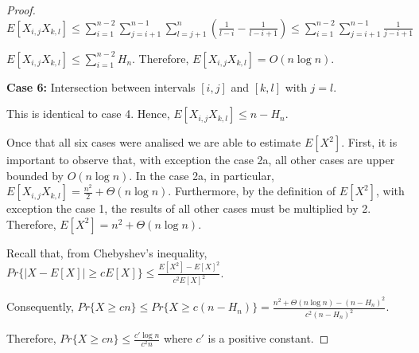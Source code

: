 \documentclass[12pt]{article}
\begin{document}
\begin{proof}
$E[X_{i,j} X_{k,l}] \leq \sum\limits_{i=1}^{n-2}
\sum\limits_{j=i+1}^{n-1} \sum\limits_{l=j+1}^{n} \left( \frac{1}{l-i} - \frac{1}{l-i+1} \right)
\leq \sum\limits_{i=1}^{n-2}
\sum\limits_{j=i+1}^{n-1} \frac{1}{j-i+1}
$

$E[X_{i,j} X_{k,l}] \leq \sum\limits_{i=1}^{n-2} H_{n}$. Therefore, $E[X_{i,j} X_{k,l}] = O(n \log n)$.


{\bf Case 6:} Intersection between intervals $[i, j]$ and $[k, l]$ with $j = l$.

This is identical to case 4. Hence, $E[X_{i,j} X_{k,l}] \leq n - H_{n}$.


\vspace{0.5cm}


Once that all six cases were analised we are able to estimate $E[X^2]$.
First, it is important to observe that, with exception the case 2a, all other cases
are upper bounded by $O(n \log n)$. In the case 2a, in particular,
$E[X_{i,j} X_{k,l}] = \frac{n^2}{2} + \Theta(n \log n)$. Furthermore, by the definition of $E[X^2]$,
with exception the case 1, the results of all other cases must be multiplied by 2.
Therefore, $E[X^2] = n^2+ \Theta(n \log n)$.

Recall that, from Chebyshev's inequality, $Pr\{ |X - E[X]| \geq c E[X] \} \leq \frac{E[X^2] - E[X]^2}{c^2 E[X]^2}$.

Consequently, $Pr\{ X \geq c n \} \leq Pr\{ X \geq c (n - H_{n}) \} = \frac{n^2 + \Theta(n \log n) - (n - H_{n})^2}{c^2 (n - H_{n})^2}$.

Therefore, $Pr\{ X \geq c n \} \leq \frac{c' \log n}{c^2 n}$ where $c'$ is a positive constant.




\end{proof}









%
\end{document}
